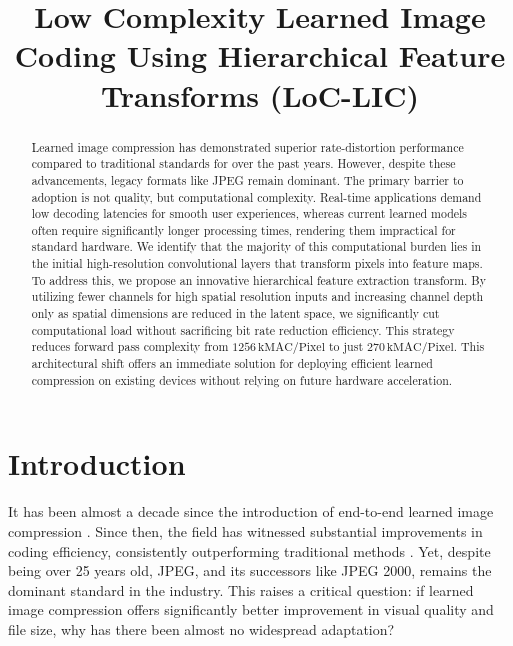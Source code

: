 \documentclass{article}
\title{Low Complexity Learned Image Coding Using Hierarchical Feature Transforms (LoC-LIC)}
\begin{document}
\maketitle
\let\thefootnote\relax{}

\begin{abstract}

Learned image compression has demonstrated superior rate-distortion performance compared to traditional standards for over the past years. However, despite these advancements, legacy formats like JPEG remain dominant. The primary barrier to adoption is not quality, but computational complexity. Real-time applications demand low decoding latencies for smooth user experiences, whereas current learned models often require significantly longer processing times, rendering them impractical for standard hardware. We identify that the majority of this computational burden lies in the initial high-resolution convolutional layers that transform pixels into feature maps. To address this, we propose an innovative hierarchical feature extraction transform. By utilizing fewer channels for high spatial resolution inputs and increasing channel depth only as spatial dimensions are reduced in the latent space, we significantly cut computational load without sacrificing bit rate reduction efficiency. This strategy reduces forward pass complexity from \(1256 \, \text{kMAC/Pixel}\) to just \(270 \, \text{kMAC/Pixel}\). This architectural shift offers an immediate solution for deploying efficient learned compression on existing devices without relying on future hardware acceleration.

\end{abstract}

\section{Introduction}

It has been almost a decade since the introduction of end-to-end learned image compression \cite{balleVariationalImageCompression2018}. Since then, the field has witnessed substantial improvements in coding efficiency, consistently outperforming traditional methods \cite{jiangMLICLinearComplexity2024}. Yet, despite being over 25 years old, JPEG, and its successors like JPEG 2000, remains the dominant standard in the industry. This raises a critical question: if learned image compression offers significantly better improvement in visual quality and file size, why has there been almost no widespread adaptation?
\end{document}
